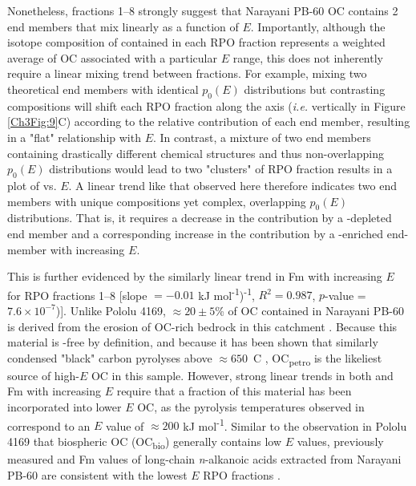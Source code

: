 Nonetheless, fractions 1--8 strongly suggest that Narayani PB-60 OC contains 2 end members that mix linearly as a function of $E$. Importantly, although the isotope composition of  contained in each RPO fraction represents a weighted average of OC associated with a particular $E$ range, this does not inherently require a linear mixing trend between fractions. For example, mixing two theoretical end members with identical $p_{0}(E)$ distributions but contrasting  compositions will shift each RPO fraction along the  axis (\textit{i.e.} vertically in Figure \ref{Ch3Fig:9}C) according to the relative contribution of each end member, resulting in a "flat"  relationship with $E$. In contrast, a mixture of two end members containing drastically different chemical structures and thus non-overlapping $p_{0}(E)$ distributions would lead to two "clusters" of RPO fraction results in a plot of  vs. $E$. A linear trend like that observed here therefore indicates two end members with unique  compositions yet complex, overlapping $p_{0}(E)$ distributions. That is, it requires a decrease in the contribution by a -depleted end member and a corresponding increase in the contribution by a -enriched end-member with increasing $E$. 

This is further evidenced by the similarly linear trend in Fm with increasing $E$ for RPO fractions 1--8 [slope $= -0.01$ kJ mol\textsuperscript{-1})\textsuperscript{-1}, $R^{2} = 0.987$, $p$-value = $7.6 \times 10^{-7}$)]. Unlike Pololu 4169, $\approx 20 \pm 5$\% of OC contained in Narayani PB-60 is derived from the erosion of OC-rich bedrock in this catchment \citep[OC\textsubscript{petro};][]{Galy:2008ff,Rosenheim:2012kh}. Because this material is -free by definition, and because it has been shown that similarly condensed "black" carbon pyrolyses above $\approx 650$\textdegree\ C \citep{Williams:2014bq}, OC\textsubscript{petro} is the likeliest source of high-$E$ OC in this sample. However, strong linear trends in both  and Fm with increasing $E$ require that a fraction of this material has been incorporated into lower $E$ OC, as the pyrolysis temperatures observed in \citet{Williams:2014bq} correspond to an $E$ value of $\approx 200$ kJ mol\textsuperscript{-1}. Similar to the observation in Pololu 4169 that biospheric OC (OC\textsubscript{bio}) generally contains low $E$ values, previously measured  and Fm values of long-chain \textit{n}-alkanoic acids extracted from Narayani PB-60 are consistent with the lowest $E$ RPO fractions \citep[Figure \ref{Ch3Fig:9}C--D;][]{Galy:2011hk,Galy:2011ix}. 

